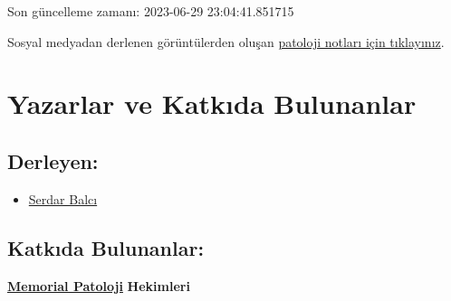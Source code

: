 \documentclass[
  letterpaper,
  DIV=11,
  numbers=noendperiod]{scrreprt}
\providecommand{\tightlist}{%
  \setlength{\itemsep}{0pt}\setlength{\parskip}{0pt}}\usepackage{longtable,booktabs,array}
\begin{document}
Son güncelleme zamanı: 2023-06-29 23:04:41.851715

Sosyal medyadan derlenen görüntülerden oluşan
\href{https://www.patolojinotlari.com/}{patoloji notları için
tıklayınız}.


\hypertarget{sec-yazarlar-katkida-bulunanlar}{%
\chapter*{Yazarlar ve Katkıda
Bulunanlar}\label{sec-yazarlar-katkida-bulunanlar}}


\hypertarget{sec-derleyen}{%
\section*{Derleyen:}\label{sec-derleyen}}


\begin{itemize}
\tightlist
\item
  \href{https://www.serdarbalci.com}{Serdar Balcı}
\end{itemize}

\hypertarget{sec-katkida-bulunanlar}{%
\section*{Katkıda Bulunanlar:}\label{sec-katkida-bulunanlar}}


\href{https://patoloji.memorial.com.tr/}{\textbf{Memorial Patoloji}}
\textbf{Hekimleri}
\end{document}
